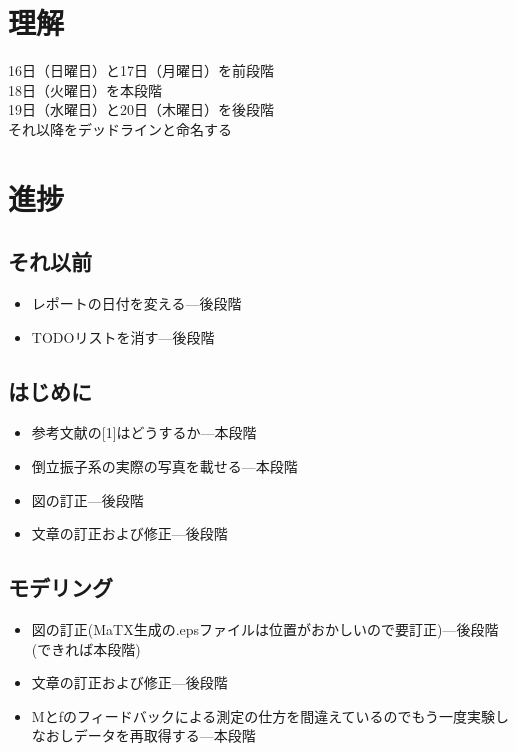 \section{理解}
16日（日曜日）と17日（月曜日）を前段階\\
18日（火曜日）を本段階\\
19日（水曜日）と20日（木曜日）を後段階\\
それ以降をデッドラインと命名する

\section{進捗}
	\subsection{それ以前}
		\begin{itemize}
		  \item レポートの日付を変える---後段階
		  \item TODOリストを消す---後段階
		\end{itemize}
	\subsection{はじめに}
		\begin{itemize}
		  \item 参考文献の[1]はどうするか---本段階
		  \item 倒立振子系の実際の写真を載せる---本段階
		  \item 図の訂正---後段階
		  \item 文章の訂正および修正---後段階
		\end{itemize}
	\subsection{モデリング}
		\begin{itemize}
		  \item 図の訂正(MaTX生成の.epsファイルは位置がおかしいので要訂正)---後段階(できれば本段階)
		  \item 文章の訂正および修正---後段階
		  \item Mとfのフィードバックによる測定の仕方を間違えているのでもう一度実験しなおしデータを再取得する---本段階
		\end{itemize}
